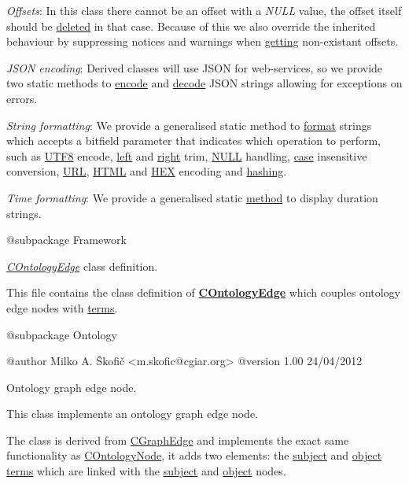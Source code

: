 \begin{DoxyItemize}
\item {\itshape Offsets}\-: In this class there cannot be an offset with a {\itshape N\-U\-L\-L} value, the offset itself should be \hyperlink{}{deleted} in that case. Because of this we also override the inherited behaviour by suppressing notices and warnings when \hyperlink{}{getting} non-\/existant offsets. 
\item {\itshape J\-S\-O\-N encoding}\-: Derived classes will use J\-S\-O\-N for web-\/services, so we provide two static methods to \hyperlink{}{encode} and \hyperlink{}{decode} J\-S\-O\-N strings allowing for exceptions on errors. 
\item {\itshape String formatting}\-: We provide a generalised static method to \hyperlink{}{format} strings which accepts a bitfield parameter that indicates which operation to perform, such as \hyperlink{}{U\-T\-F8} encode, \hyperlink{}{left} and \hyperlink{}{right} trim, \hyperlink{}{N\-U\-L\-L} handling, \hyperlink{}{case} insensitive conversion, \hyperlink{}{U\-R\-L}, \hyperlink{}{H\-T\-M\-L} and \hyperlink{}{H\-E\-X} encoding and \hyperlink{}{hashing}. 
\item {\itshape Time formatting}\-: We provide a generalised static \hyperlink{}{method} to display duration strings. 
\end{DoxyItemize}

\begin{DoxyVerb}    @subpackage     Framework\end{DoxyVerb}


{\itshape \hyperlink{class_c_ontology_edge}{C\-Ontology\-Edge}} class definition.

This file contains the class definition of {\bfseries \hyperlink{class_c_ontology_edge}{C\-Ontology\-Edge}} which couples ontology edge nodes with \hyperlink{class_c_ontology_term}{terms}.

\begin{DoxyVerb}    @subpackage     Ontology

    @author         Milko A. Škofič <m.skofic@cgiar.org>
    @version        1.00 24/04/2012\end{DoxyVerb}


Ontology graph edge node.

This class implements an ontology graph edge node.

The class is derived from \hyperlink{class_c_graph_edge}{C\-Graph\-Edge} and implements the exact same functionality as \hyperlink{class_c_ontology_node}{C\-Ontology\-Node}, it adds two elements\-: the \hyperlink{}{subject} and \hyperlink{}{object} \hyperlink{class_c_ontology_term}{terms} which are linked with the \hyperlink{}{subject} and \hyperlink{}{object} nodes.

